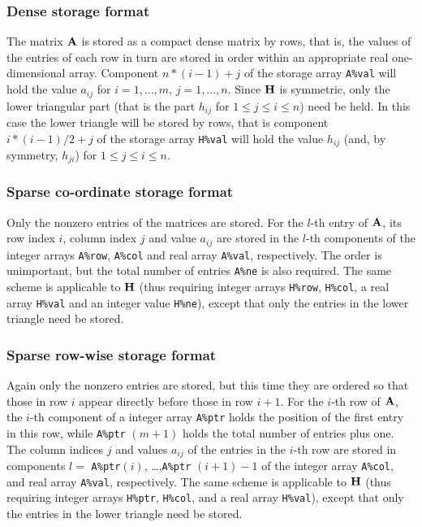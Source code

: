 \documentclass{galahad}
\begin{document}
\subsubsection{Dense storage format}\label{dense}
The matrix ${\mathbf{A}}$ is stored as a compact 
dense matrix by rows, that is, the values of the entries of each row in turn are
stored in order within an appropriate real one-dimensional array.
Component $n \ast (i-1) + j$ of the storage array {\tt A\%val} will hold the 
value $a_{ij}$ for $i = 1, \ldots , m$, $j = 1, \ldots , n$.
Since ${\mathbf{H}}$ is symmetric, only the lower triangular part (that is the part 
$h_{ij}$ for $1 \leq j \leq i \leq n$) need be held. In this case
the lower triangle will be stored by rows, that is 
component $i \ast (i-1)/2 + j$ of the storage array {\tt H\%val}  
will hold the value $h_{ij}$ (and, by symmetry, $h_{ji}$)
for $1 \leq j \leq i \leq n$.

\subsubsection{Sparse co-ordinate storage format}\label{coordinate}
Only the nonzero entries of the matrices are stored. For the 
$l$-th entry of ${\mathbf{A}}$, its row index $i$, column index $j$ 
and value $a_{ij}$
are stored in the $l$-th components of the integer arrays {\tt A\%row}, 
{\tt A\%col} and real array {\tt A\%val}, respectively.
The order is unimportant, but the total
number of entries {\tt A\%ne} is also required. 
The same scheme is applicable to
${\mathbf{H}}$ (thus requiring integer arrays {\tt H\%row}, {\tt H\%col}, a real array 
{\tt H\%val} and an integer value {\tt H\%ne}),
except that only the entries in the lower triangle need be stored.

\subsubsection{Sparse row-wise storage format}\label{rowwise}
Again only the nonzero entries are stored, but this time
they are ordered so that those in row $i$ appear directly before those
in row $i+1$. For the $i$-th row of ${\mathbf{A}}$, the $i$-th component of a 
integer array {\tt A\%ptr} holds the position of the first entry in this row,
while {\tt A\%ptr} $(m+1)$ holds the total number of entries plus one.
The column indices $j$ and values $a_{ij}$ of the entries in the $i$-th row 
are stored in components 
$l =$ {\tt A\%ptr}$(i)$, \ldots ,{\tt A\%ptr} $(i+1)-1$ of the 
integer array {\tt A\%col}, and real array {\tt A\%val}, respectively. 
The same scheme is applicable to
${\mathbf{H}}$ (thus requiring integer arrays {\tt H\%ptr}, {\tt H\%col}, and 
a real array {\tt H\%val}),
except that only the entries in the lower triangle need be stored.
\end{document}

